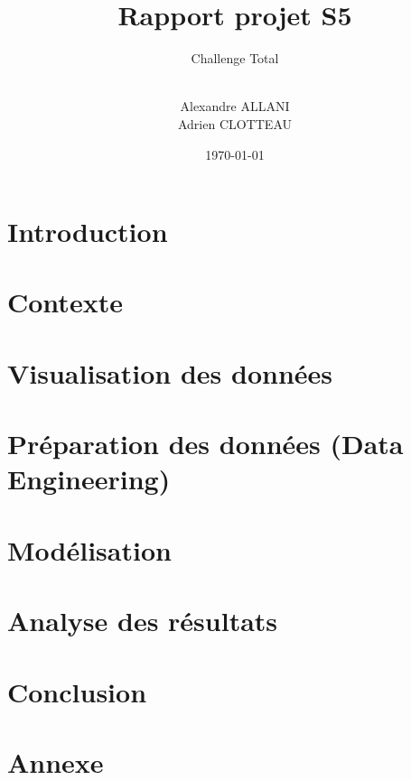 \documentclass{article} %
\author{\\ Alexandre ALLANI \\
	Adrien CLOTTEAU }
\date{\noexpand\today} %
\title{Rapport projet S5}
\subtitle{Challenge Total}
\begin{document}
	
\imtaMaketitlepage
\tableofcontents
\newpage

\section{Introduction}
\section{Contexte}
\section{Visualisation des données}

\section{Préparation des données (Data Engineering)}

\section{Modélisation}

\section{Analyse des résultats}

\section{Conclusion}

\section{Annexe}
\end{document}
